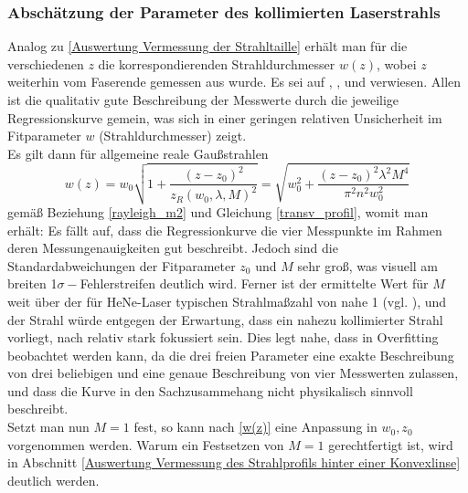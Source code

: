\documentclass[11pt,a4paper,oneside]{scrartcl}
\begin{document}
\subsubsection{Abschätzung der Parameter des kollimierten Laserstrahls}
Analog zu \ref{Auswertung Vermessung der Strahltaille} erhält man für die verschiedenen $z$ die korrespondierenden Strahldurchmesser $w(z)$, wobei $z$ weiterhin vom Faserende gemessen aus wurde. Es sei auf , ,  und  verwiesen. Allen ist die qualitativ gute Beschreibung der Messwerte durch die jeweilige Regressionskurve gemein, was sich in einer geringen relativen Unsicherheit im Fitparameter $w$ (Strahldurchmesser) zeigt.\\
Es gilt dann für allgemeine reale Gaußstrahlen
\begin{equation}\label{w(z)}
w(z)=w_0\sqrt{1+\frac{(z-z_0)^2}{z_R(w_0,\lambda,M)^2}}=\sqrt{w_0^2+\frac{(z-z_0)^2\lambda^2M^4}{\pi^2n^2w_0^2}}
\end{equation}
gemäß Beziehung \ref{rayleigh_m2} und Gleichung \ref{transv_profil}, womit man  erhält: 
Es fällt auf, dass die Regressionkurve die vier Messpunkte im Rahmen deren Messungenauigkeiten gut beschreibt. Jedoch sind die Standardabweichungen der Fitparameter $z_0$ und $M$ sehr groß, was visuell am breiten 1$\sigma-$Fehlerstreifen deutlich wird. Ferner ist der ermittelte Wert für $M$ weit über der für HeNe-Laser typischen Strahlmaßzahl von nahe 1 (vgl. \cite{paschotta2008beam}), und der Strahl würde entgegen der Erwartung, dass ein nahezu kollimierter Strahl vorliegt, nach  relativ stark fokussiert sein. Dies legt nahe, dass in  Overfitting beobachtet werden kann, da die drei freien Parameter eine exakte Beschreibung von drei beliebigen und eine genaue Beschreibung von vier Messwerten zulassen, und dass die Kurve in  den Sachzusammehang nicht physikalisch sinnvoll beschreibt.\\
Setzt man nun $M=1$ fest, so kann nach \ref{w(z)} eine Anpassung in $w_0,z_0$ vorgenommen werden. Warum ein Festsetzen von $M=1$ gerechtfertigt ist, wird in Abschnitt \ref{Auswertung Vermessung des Strahlprofils hinter einer Konvexlinse} deutlich werden.
\end{document}
